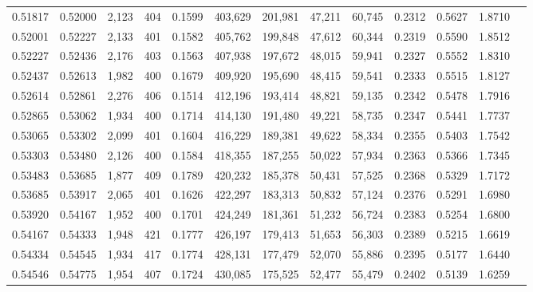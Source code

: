 \begin{tabular}{rrrrrrrrrrrrr}
0.51817 & 0.52000 &  2,123 &   404 &                                     0.1599 & 403,629 & 201,981 &  47,211 &  60,745 & 0.2312 & 0.5627 & 1.8710 \\
0.52001 & 0.52227 &  2,133 &   401 &                                     0.1582 & 405,762 & 199,848 &  47,612 &  60,344 & 0.2319 & 0.5590 & 1.8512 \\
0.52227 & 0.52436 &  2,176 &   403 &                                     0.1563 & 407,938 & 197,672 &  48,015 &  59,941 & 0.2327 & 0.5552 & 1.8310 \\
0.52437 & 0.52613 &  1,982 &   400 &                                     0.1679 & 409,920 & 195,690 &  48,415 &  59,541 & 0.2333 & 0.5515 & 1.8127 \\
0.52614 & 0.52861 &  2,276 &   406 &                                     0.1514 & 412,196 & 193,414 &  48,821 &  59,135 & 0.2342 & 0.5478 & 1.7916 \\
0.52865 & 0.53062 &  1,934 &   400 &                                     0.1714 & 414,130 & 191,480 &  49,221 &  58,735 & 0.2347 & 0.5441 & 1.7737 \\
0.53065 & 0.53302 &  2,099 &   401 &                                     0.1604 & 416,229 & 189,381 &  49,622 &  58,334 & 0.2355 & 0.5403 & 1.7542 \\
0.53303 & 0.53480 &  2,126 &   400 &                                     0.1584 & 418,355 & 187,255 &  50,022 &  57,934 & 0.2363 & 0.5366 & 1.7345 \\
0.53483 & 0.53685 &  1,877 &   409 &                                     0.1789 & 420,232 & 185,378 &  50,431 &  57,525 & 0.2368 & 0.5329 & 1.7172 \\
0.53685 & 0.53917 &  2,065 &   401 &                                     0.1626 & 422,297 & 183,313 &  50,832 &  57,124 & 0.2376 & 0.5291 & 1.6980 \\
0.53920 & 0.54167 &  1,952 &   400 &                                     0.1701 & 424,249 & 181,361 &  51,232 &  56,724 & 0.2383 & 0.5254 & 1.6800 \\
0.54167 & 0.54333 &  1,948 &   421 &                                     0.1777 & 426,197 & 179,413 &  51,653 &  56,303 & 0.2389 & 0.5215 & 1.6619 \\
0.54334 & 0.54545 &  1,934 &   417 &                                     0.1774 & 428,131 & 177,479 &  52,070 &  55,886 & 0.2395 & 0.5177 & 1.6440 \\
0.54546 & 0.54775 &  1,954 &   407 &                                     0.1724 & 430,085 & 175,525 &  52,477 &  55,479 & 0.2402 & 0.5139 & 1.6259 \\

\end{tabular}
